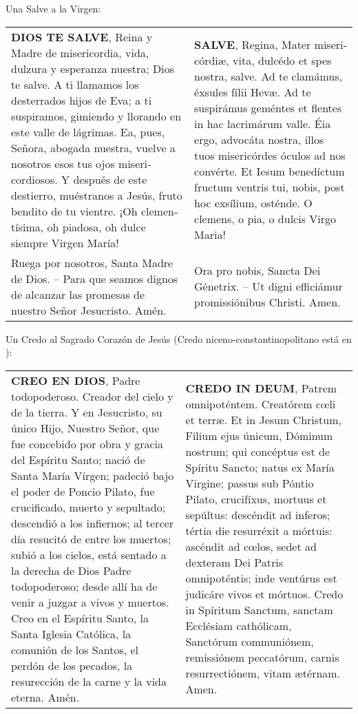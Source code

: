 \documentclass[./rosary.tex]{subfiles}
\begin{document}
\bigskip

Una Salve a la Virgen:
\begin{longtable} { p{} p{} }
\label{hailMaryQueen}
    \textbf{DIOS TE SALVE}, Reina y Madre de mi­se­ri­cordia, vida, dulzura y esperanza nuestra; Dios te salve.
    A ti llamamos los desterrados hijos de Eva; a ti suspiramos, gimiendo y llorando en este valle de lágrimas.
    Ea, pues, Señora, abogada nuestra, vuelve a nosotros esos tus ojos mi­se­ri­cordiosos. Y después de este destierro, muéstranos a Jesús,
    fruto bendito de tu vientre. ¡Oh cle­men­tísima, oh piadosa, oh dulce siempre Virgen María!
        &
    \textbf{SALVE}, Regina, Mater mi­se­ri­córdiæ, vita, dulcédo et spes nostra, salve. Ad te clamámus, éxsules fílii Hevæ.
    Ad te suspirámus geméntes et flentes in hac lacrimárum valle. Éia ergo, advocáta nostra, illos tuos mi­se­ri­córdes óculos ad nos convérte.
    Et Iesum benedíctum fructum ventris tui, nobis, post hoc exsílium, osténde. O clemens, o pia, o dulcis Virgo Maria!\\

    Ruega por nosotros, Santa Madre de Dios. -- Para que seamos dignos de alcanzar las promesas de nuestro Señor Jesucristo. Amén.                                           
        & 
    Ora pro nobis, Sancta Dei Génetrix. -- Ut digni efficiámur pro­mi­ssiónibus Christi. Amen.\\
\end{longtable}

Un Credo al Sagrado Corazón de Jesús (Credo niceno-constantinopolitano está en ):

\begin{longtable} { p{} p{} }
    \label{creed-apostles}
    \textbf{CREO EN DIOS}, Padre todopoderoso. Creador del cielo y de la tierra. Y en Jesucristo, su único Hijo, Nuestro Señor,
    que fue concebido por obra y gracia del Espíritu Santo; nació de Santa María Vírgen; padeció bajo el poder de Poncio Pilato,
    fue crucificado, muerto y sepultado; descendió a los infiernos; al tercer día resucitó de entre los muertos; subió a los cielos,
    está sentado a la derecha de Dios Padre todopoderoso; desde allí ha de venir a juzgar a vivos y muertos.
    Creo en el Espíritu Santo, la Santa Iglesia Católica, la comunión de los Santos, el perdón de los pecados,
    la resurección de la carne y la vida eterna. Amén.
        &
    \textbf{CREDO IN DEUM}, Patrem omnipoténtem. Creatórem cœli et terræ. Et in Jesum Christum, Filium ejus únicum, Dóminum nostrum;
    qui concéptus est de Spíritu Sancto; natus ex María Virgine; passus sub Póntio Pilato, crucifíxus, mortuus et sepúltus:
    descéndit ad inferos; tértia die resurréxit a mórtuis: ascéndit ad cœlos, sedet ad dexteram Dei Patris omnipoténtis;
    inde ventúrus est judicáre vivos et mórtuos. Credo in Spíritum Sanctum, sanctam Ecclésiam cathólicam, Sanctórum communiónem,
    remissiónem peccatórum, carnis resurrectiónem, vitam ætérnam. Amen.\\
\end{longtable}
\end{document}
